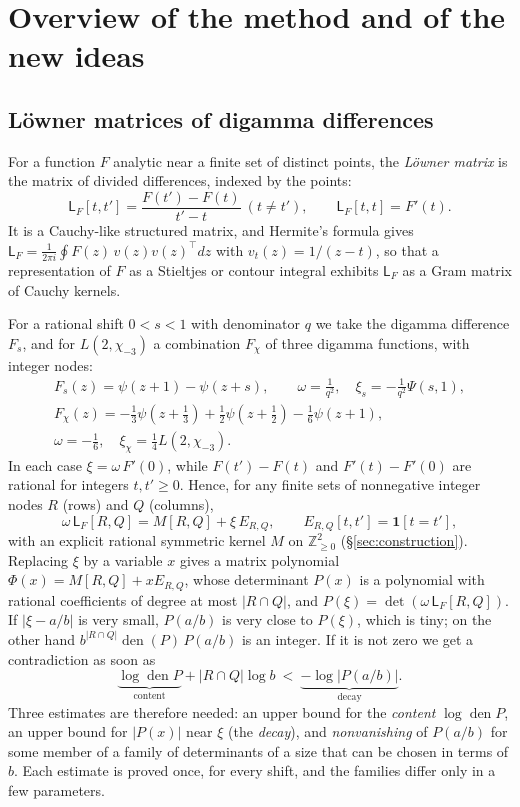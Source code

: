 \documentclass[11pt]{amsart}
\theoremstyle{definition}
\theoremstyle{remark}
\numberwithin{equation}{section}
\newcommand{\Z}{\mathbb Z}
\newcommand{\den}{\operatorname{den}}
\newcommand{\Lw}{\mathsf L}          %
\begin{document}
\section{Overview of the method and of the new ideas}\label{sec:overview}

\subsection{L\"owner matrices of digamma differences}
For a function $F$ analytic near a finite set of distinct points, the \emph{L\"owner matrix}
\cite{Loewner34} is the matrix of divided differences, indexed by the points:
\[
 \Lw_F[t,t']=\frac{F(t')-F(t)}{t'-t}\ (t\ne t'),\qquad \Lw_F[t,t]=F'(t).
\]
It is a Cauchy-like structured matrix, and Hermite's formula gives
$\Lw_F=\frac1{2\pi i}\oint F(z)\,v(z)v(z)^{\top}dz$ with $v_t(z)=1/(z-t)$, so that a representation of
$F$ as a Stieltjes or contour integral exhibits $\Lw_F$ as a Gram matrix of Cauchy kernels.

For a rational shift $0<s<1$ with denominator $q$ we take the digamma difference $F_s$, and for $L(2,\chi_{-3})$ a
combination $F_\chi$ of three digamma functions, with integer nodes:
\begin{equation}\label{eq:frames}
\begin{gathered}
 F_s(z)=\psi(z+1)-\psi(z+s),\qquad \omega=\tfrac1{q^2},\quad \xi_s=-\tfrac1{q^2}\Psi(s,1),\\
 F_{\chi}(z)=-\tfrac13\psi(z+\tfrac13)+\tfrac12\psi(z+\tfrac12)-\tfrac16\psi(z+1),\\
 \omega=-\tfrac16,\quad \xi_\chi=\tfrac14L(2,\chi_{-3}).
\end{gathered}
\end{equation}
In each case $\xi=\omega\,F'(0)$, while $F(t')-F(t)$ and $F'(t)-F'(0)$ are rational for integers $t,t'\ge0$. Hence, for
any finite sets of nonnegative integer nodes $R$ (rows) and $Q$ (columns),
\begin{equation}\label{eq:shift}
 \omega\,\Lw_F[R,Q]=M[R,Q]+\xi\,E_{R,Q},\qquad E_{R,Q}[t,t']=\mathbf 1[t=t'],
\end{equation}
with an explicit rational symmetric kernel $M$ on $\Z_{\ge0}^2$ (\S\ref{sec:construction}). Replacing $\xi$ by
a variable $x$ gives a matrix polynomial $\Phi(x)=M[R,Q]+xE_{R,Q}$, whose determinant $P(x)$ is a polynomial
with rational coefficients of degree at most $|R\cap Q|$, and $P(\xi)=\det(\omega\,\Lw_F[R,Q])$. If
$|\xi-a/b|$ is very small, $P(a/b)$ is very close to $P(\xi)$, which is tiny; on the other hand
$b^{|R\cap Q|}\den(P)\,P(a/b)$ is an integer. If it is not zero we get a contradiction as soon as
\[
 \underbrace{\log\den P}_{\text{content}}+|R\cap Q|\log b\ <\ \underbrace{-\log|P(a/b)|}_{\text{decay}} .
\]
Three estimates are therefore needed: an upper bound for the \emph{content} $\log\den P$, an upper bound
for $|P(x)|$ near $\xi$ (the \emph{decay}), and \emph{nonvanishing} of $P(a/b)$ for some member of a family of
determinants of a size that can be chosen in terms of $b$. Each estimate is proved once, for every shift, and the
families differ only in a few parameters.
\end{document}
